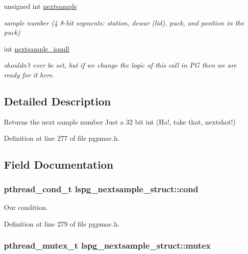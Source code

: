 \begin{DoxyCompactItemize}
unsigned int \hyperlink{structlspg__nextsample__struct_aecd82b329462ae06bc2f0d162985a086}{nextsample}
\begin{DoxyCompactList}\small\item\em sample number (4 8-\/bit segments\-: station, dewar (lid), puck, and position in the puck) \end{DoxyCompactList}\item 
int \hyperlink{structlspg__nextsample__struct_a2ca6e2a667c9fe7f1a54329de04d2a3c}{nextsample\-\_\-isnull}
\begin{DoxyCompactList}\small\item\em shouldn't ever be set, but if we change the logic of this call in P\-G then we are ready for it here. \end{DoxyCompactList}\end{DoxyCompactItemize}


\subsection{Detailed Description}
Returns the next sample number Just a 32 bit int (Ha!, take that, nextshot!) 

Definition at line 277 of file pgpmac.\-h.



\subsection{Field Documentation}
\hypertarget{structlspg__nextsample__struct_a5b46e4537dac3be839f6c3eeff6b46b6}{
\subsubsection[{cond}]{\setlength{\rightskip}{0pt plus 5cm}pthread\-\_\-cond\-\_\-t lspg\-\_\-nextsample\-\_\-struct\-::cond}}\label{structlspg__nextsample__struct_a5b46e4537dac3be839f6c3eeff6b46b6}


Our condition. 



Definition at line 279 of file pgpmac.\-h.

\hypertarget{structlspg__nextsample__struct_a99408b5825e2510f07be199d2cdc3633}{
\subsubsection[{mutex}]{\setlength{\rightskip}{0pt plus 5cm}pthread\-\_\-mutex\-\_\-t lspg\-\_\-nextsample\-\_\-struct\-::mutex}}\label{structlspg__nextsample__struct_a99408b5825e2510f07be199d2cdc3633}


